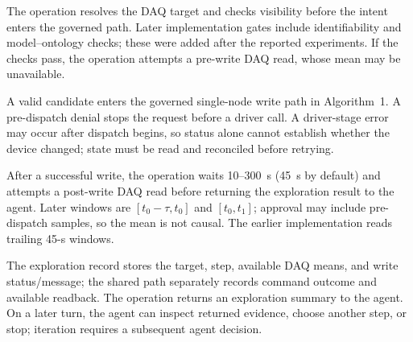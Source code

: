 The operation resolves the DAQ target and checks visibility before the intent enters the governed path. Later implementation gates include identifiability and model--ontology checks; these were added after the reported experiments. If the checks pass, the operation attempts a pre-write DAQ read, whose mean may be unavailable.

A valid candidate enters the governed single-node write path in Algorithm~1. A pre-dispatch denial stops the request before a driver call. A driver-stage error may occur after dispatch begins, so status alone cannot establish whether the device changed; state must be read and reconciled before retrying.

After a successful write, the operation waits 10--300~s (45~s by default) and attempts a post-write DAQ read before returning the exploration result to the agent. Later windows are $[t_0-\tau,t_0]$ and $[t_0,t_1]$; approval may include pre-dispatch samples, so the mean is not causal. The earlier implementation reads trailing 45-s windows.

The exploration record stores the target, step, available DAQ means, and write status/message; the shared path separately records command outcome and available readback. The operation returns an exploration summary to the agent. On a later turn, the agent can inspect returned evidence, choose another step, or stop; iteration requires a subsequent agent decision.


